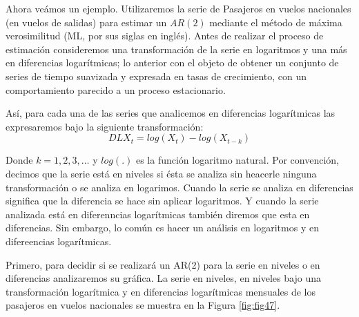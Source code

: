 \documentclass[
]{book}
\begin{document}
Ahora veámos un ejemplo. Utilizaremos la serie de Pasajeros en vuelos nacionales (en vuelos de salidas) para estimar un \(AR(2)\) mediante el método de máxima verosimilitud (ML, por sus siglas en inglés). Antes de realizar el proceso de estimación consideremos una transformación de la serie en logaritmos y una más en diferencias logarítmicas; lo anterior con el objeto de obtener un conjunto de series de tiempo suavizada y expresada en tasas de crecimiento, con un comportamiento parecido a un proceso estacionario.

Así, para cada una de las series que analicemos en diferencias logarítmicas las expresaremos bajo la siguiente transformación:
\begin{equation*}
    DLX_t = log(X_t) - log(X_{t-k})
\end{equation*}

Donde \(k = 1, 2, 3, \ldots\) y \(log(.)\) es la función logaritmo natural. Por convención, decimos que la serie está en niveles si ésta se analiza sin heacerle ninguna transformación o se analiza en logarimos. Cuando la serie se analiza en diferencias significa que la diferencia se hace sin aplicar logaritmos. Y cuando la serie analizada está en diferenncias logarítmicas también diremos que esta en diferencias. Sin embargo, lo común es hacer un análisis en logaritmos y en difereencias logarítmicas.

Primero, para decidir si se realizará un AR(2) para la serie en niveles o en diferencias analizaremos su gráfica. La serie en niveles, en niveles bajo una transformación logarítmica y en diferencias logarítmicas mensuales de los pasajeros en vuelos nacionales se muestra en la Figura \ref{fig:fig47}.
\end{document}
